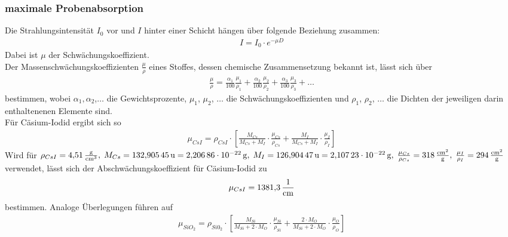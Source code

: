 \documentclass[a4paper,twoside,final]{article}
\begin{document}
\subsubsection{maximale Probenabsorption}\label{sec:Probenabsorption}

Die Strahlungsintensität $I_0$ vor und $I$ hinter einer Schicht hängen über folgende Beziehung zusammen:
\begin{align}\label{equ:Probenabsorption}
  I = I_0 \cdot e^{-\mu D}
\end{align}
Dabei ist $\mu$ der Schwächungskoeffizient. \\
Der Massenschwächungskoeffizienten $\frac{\mu}{\rho}$ eines Stoffes, dessen chemische Zusammensetzung bekannt ist, lässt sich über
\begin{align}
  \frac{\mu}{\rho} = \frac{\alpha_1}{100}\frac{\mu_1}{\rho_1}+\frac{\alpha_2}{100}\frac{\mu_2}{\rho_2}+\frac{\alpha_3}{100}\frac{\mu_3}{\rho_3}+\hdots
\end{align}
bestimmen, wobei $\alpha_1, \alpha_2$,$\hdots$ die Gewichtsprozente, $\mu_1$, $\mu_2$, $\hdots$ die Schwächungskoeffizienten und $\rho_1$, $\rho_2$, $\hdots$  die Dichten der jeweiligen darin enthaltenenen Elemente sind. \cite{Glocker}\\
Für Cäsium-Iodid ergibt sich so
\begin{align}
  \mu_{CsI} = \rho_{CsI} \cdot \left[\frac{M_{Cs}}{M_{Cs}+M_{I}}\cdot \frac{\mu_{Cs}}{\rho_{Cs}}+\frac{M_{I}}{M_{Cs}+M_I}\cdot \frac{\mu_I}{\rho_I}\right]
\end{align}
Wird für $\rho_{CsI} = \SI{4,51}{\frac{\gram}{\centi\meter\cubed}},\; M_{Cs} = \SI{132,90545}{\text{u}}=\SI{2,20686E-22}{\gram},\; M_{I} = \SI{126,90447}{\text{u}}=\SI{2,10723E-22}{\gram},\; \frac{\mu_{Cs}}{\rho_{Cs}} = \SI{318}{\frac{\centi\meter\squared}{\gram}}, \;\frac{\mu_{I}}{\rho_{I}} = \SI{294}{\frac{\centi\meter\squared}{\gram}} $
verwendet, lässt sich der Abschwächungskoeffizient für Cäsium-Iodid zu
\begin{align}\label{equ:mü_CSI}
\mu_{CsI}= \SI{1381,3}{\frac{1}{\centi\meter}}
\end{align}
bestimmen.
Analoge Überlegungen führen auf
\begin{align}
  \mu_{SiO_2} = \rho_{Si0_2} \cdot \left[\frac{M_{Si}}{M_{Si}+2\cdot M_{O}}\cdot \frac{\mu_{Si}}{\rho_{Si}}+\frac{2\cdot M_{O}}{M_{Si}+2\cdot M_O}\cdot \frac{\mu_O}{\rho_O}\right]
\end{align}
\end{document}
